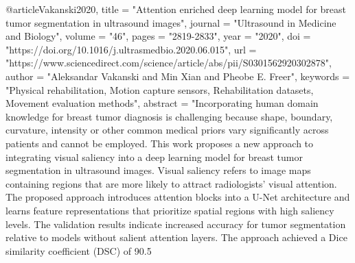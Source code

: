 @article{Vakanski2020,
title = "Attention enriched deep learning model for breast tumor segmentation in ultrasound images",
journal = "Ultrasound in Medicine and Biology",
volume = "46",
pages = "2819-2833",
year = "2020",
doi = "https://doi.org/10.1016/j.ultrasmedbio.2020.06.015",
url = "https://www.sciencedirect.com/science/article/abs/pii/S0301562920302878",
author = "Aleksandar Vakanski and Min Xian and Pheobe E. Freer",
keywords = "Physical rehabilitation, Motion capture sensors, Rehabilitation datasets, Movement evaluation methods",
abstract = "Incorporating human domain knowledge for breast tumor diagnosis is challenging because shape, boundary, curvature, intensity or other common medical priors vary significantly across patients and cannot be employed. This work proposes a new approach to integrating visual saliency into a deep learning model for breast tumor segmentation in ultrasound images. Visual saliency refers to image maps containing regions that are more likely to attract radiologists’ visual attention. The proposed approach introduces attention blocks into a U-Net architecture and learns feature representations that prioritize spatial regions with high saliency levels. The validation results indicate increased accuracy for tumor segmentation relative to models without salient attention layers. The approach achieved a Dice similarity coefficient (DSC) of 90.5%
}